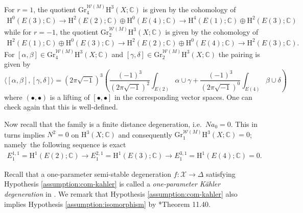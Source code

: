 \begin{situation}
For \(r=1\), the quotient \(\mathrm{Gr}_{4}^{\mathcal{W}(M)}
\mathrm{H}^{3}(X;\mathbb{C})\) is given by
the cohomology of
\begin{eqnarray*}
\mathrm{H}^{0}(E(3);\mathbb{C})\to 
\mathrm{H}^{2}(E(2);\mathbb{C})\oplus\mathrm{H}^{0}(E(4);\mathbb{C})\to 
\mathrm{H}^{4}(E(1);\mathbb{C})\oplus\mathrm{H}^{2}(E(3);\mathbb{C})
\end{eqnarray*}
while for \(r=-1\), the quotient \(\mathrm{Gr}_{2}^{\mathcal{W}(M)}
\mathrm{H}^{3}(X;\mathbb{C})\) is given by
the cohomology of
\begin{eqnarray*} 
\mathrm{H}^{2}(E(1);\mathbb{C})\oplus\mathrm{H}^{0}(E(3);\mathbb{C})\to 
\mathrm{H}^{2}(E(2);\mathbb{C})\oplus\mathrm{H}^{0}(E(4);\mathbb{C})\to 
\mathrm{H}^{2}(E(3);\mathbb{C}).
\end{eqnarray*}
For \([\alpha,\beta]\in
\mathrm{Gr}_{4}^{\mathcal{W}(M)}\mathrm{H}^{3}(X;\mathbb{C})\)
and \([\gamma,\delta]\in
\mathrm{Gr}_{2}^{\mathcal{W}(M)}\mathrm{H}^{3}(X;\mathbb{C})\)
the pairing is given by
\begin{equation}
\label{eq:pairing-gr24}
\langle [\alpha,\beta],[\gamma,\delta]\rangle 
= (2\pi\sqrt{-1})^{3}\left(\frac{(-1)^{3}}{(2\pi\sqrt{-1})^{2}}
\int_{E(2)} \alpha\cup\gamma
+\frac{(-1)^{3}}{(2\pi\sqrt{-1})^{0}}
\int_{E(4)} \beta\cup\delta\right)
\end{equation}
where \((\bullet,\bullet)\) is a lifting of 
\([\bullet,\bullet]\) in the corresponding vector spaces.
One can check again that this is well-defined. 
\end{situation}

Now recall that the family is a finite distance degeneration, i.e.~\(Na_{0}=0\).
This in turns implies \(N^{2}=0\) on \(\mathrm{H}^{3}(X;\mathbb{C})\)
and consequently \(\mathrm{Gr}_{1}^{\mathcal{W}(M)}\mathrm{H}^{3}(X;\mathbb{C})=0\); namely~the
following sequence is exact
\begin{eqnarray}
\label{eq:E21}
E_{1}^{1,1}=\mathrm{H}^{1}(E(2);\mathbb{C})\to
E^{2,1}_{1}=\mathrm{H}^{1}(E(3);\mathbb{C})\to E^{3,1}_{1}=\mathrm{H}^{1}(E(4);\mathbb{C})=0.
\end{eqnarray}

Recall that a one-parameter semi-stable degeneration \(f\colon\mathcal{X}\to\Delta\) 
satisfying Hypothesis \ref{assumption:com-kahler}
is called a \emph{one-parameter K\"{a}hler degeneration} in \cite{2008-Peters-Steenbrink-mixed-Hodge-structures}. We remark that
Hypothesis \ref{assumption:com-kahler} also implies
Hypothesis \ref{assumption:isomorphism} by 
\cite{2008-Peters-Steenbrink-mixed-Hodge-structures}*{Theorem 11.40}.

